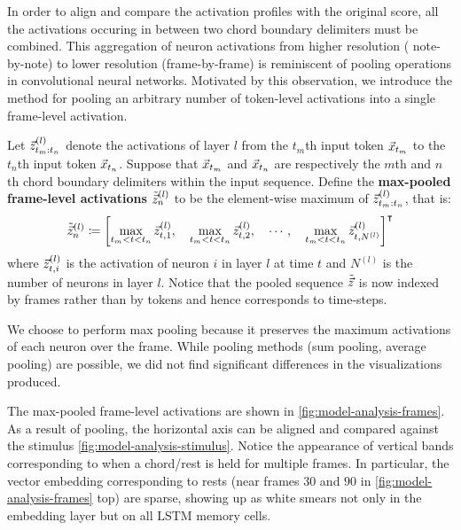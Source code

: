 In order to align and compare the activation profiles with the original score,
all the activations occuring in between two chord boundary delimiters must be
combined. This aggregation of neuron activations from higher resolution (\ie
note-by-note) to lower resolution (\ie frame-by-frame) is reminiscent of
pooling operations in convolutional neural networks. Motivated by
this observation, we introduce the method for pooling an arbitrary number of
token-level activations into a single frame-level activation.

Let $\vec{z}^{(l)}_{{t_m}:{t_n}}$ denote the activations of layer $l$ from the $t_m$th input token $\vec{x}_{t_m}$
to the $t_n$th input token $\vec{x}_{t_n}$. Suppose that $\vec{x}_{t_m}$ and $\vec{x}_{t_n}$ are respectively the
$m$th and $n$th chord boundary delimiters within the input sequence. Define the
\textbf{max-pooled frame-level activations} $\tilde{\vec{z}}^{(l)}_n$ to be the
element-wise maximum of $\vec{z}^{(l)}_{{t_m}:{t_n}}$, that is:
\begin{equation}
    \tilde{\vec{z}}^{(l)}_n \coloneqq \left[
        \max_{t_m < t < t_n} \vec{z}^{(l)}_{t,1},\quad
        \max_{t_m < t < t_n} \vec{z}^{(l)}_{t,2},\quad
        \cdots,\quad
        \max_{t_m < t < t_n} \vec{z}^{(l)}_{t,N^{(l)}}
    \right]^\intercal
\end{equation}
where $\vec{z}^{(l)}_{t,i}$ is the activation of neuron $i$ in layer $l$ at time $t$
and $N^{(l)}$ is the number of neurons in layer $l$. Notice that the pooled
sequence $\tilde{\vec{z}}$ is now indexed by frames rather than by tokens and hence
corresponds to time-steps.

We choose to perform max pooling because it preserves the maximum activations
of each neuron over the frame. While pooling methods (\eg sum pooling, average
pooling) are possible, we did not find significant differences in the
visualizations produced.

The max-pooled frame-level activations are shown in
\cref{fig:model-analysis-frames}. As a result of pooling, the horizontal axis
can be aligned and compared against the stimulus
\cref{fig:model-analysis-stimulus}. Notice the appearance of vertical bands
corresponding to when a chord/rest is held for multiple frames. In particular,
the vector embedding corresponding to rests (\eg near frames $30$ and $90$ in
\cref{fig:model-analysis-frames} top) are sparse, showing up as white smears
not only in the embedding layer but on all LSTM memory cells.

